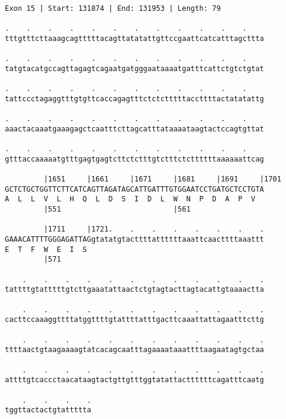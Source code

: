 \documentclass{article}
\begin{document}
\begin{Verbatim}[fontfamily=courier]
Exon 15 | Start: 131874 | End: 131953 | Length: 79

.    .    .    .    .    .    .    .    .    .    .    .    
tttgtttcttaaagcagtttttacagttatatattgttccgaattcatcatttagcttta

.    .    .    .    .    .    .    .    .    .    .    .    
tatgtacatgccagttagagtcagaatgatgggaataaaatgatttcattctgtctgtat

.    .    .    .    .    .    .    .    .    .    .    .    
tattccctagaggtttgtgttcaccagagtttctctctttttaccttttactatatattg

.    .    .    .    .    .    .    .    .    .    .    .    
aaactacaaatgaaagagctcaatttcttagcatttataaaataagtactccagtgttat

.    .    .    .    .    .    .    .    .    .    .    .    
gtttaccaaaaatgtttgagtgagtcttctctttgtctttctcttttttaaaaaattcag

         |1651     |1661     |1671     |1681     |1691     |1701
GCTCTGCTGGTTCTTCATCAGTTAGATAGCATTGATTTGTGGAATCCTGATGCTCCTGTA
A  L  L  V  L  H  Q  L  D  S  I  D  L  W  N  P  D  A  P  V  
         |551                          |561                 

         |1711     |1721.    .    .    .    .    .    .    .
GAAACATTTTGGGAGATTAGgtatatgtacttttattttttaaattcaacttttaaattt
E  T  F  W  E  I  S                                         
         |571                                               

    .    .    .    .    .    .    .    .    .    .    .    .
tattttgtatttttgtcttgaaatattaactctgtagtacttagtacattgtaaaactta

    .    .    .    .    .    .    .    .    .    .    .    .
cacttccaaaggttttatggttttgtattttatttgacttcaaattattagaatttcttg

    .    .    .    .    .    .    .    .    .    .    .    .
ttttaactgtaagaaaagtatcacagcaatttagaaaataaattttaagaatagtgctaa

    .    .    .    .    .    .    .    .    .    .    .    .
attttgtcaccctaacataagtactgttgtttggtatattacttttttcagatttcaatg

    .    .    .    .
tggttactactgtattttta
\end{Verbatim}
\newpage
\end{document}
